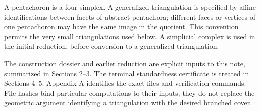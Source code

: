 \documentclass[11pt,letterpaper]{article}
\begin{document}
A pentachoron is a four-simplex. A generalized triangulation is specified by affine identifications between facets of abstract pentachora; different faces or vertices of one pentachoron may have the same image in the quotient. This convention permits the very small triangulations used below. A simplicial complex is used in the initial reduction, before conversion to a generalized triangulation.

The construction dossier and earlier reduction are explicit inputs to this note, summarized in Sections 2--3. The terminal standardness certificate is treated in Sections 4--5. Appendix A identifies the exact files and verification commands. File hashes bind particular computations to their inputs; they do not replace the geometric argument identifying a triangulation with the desired branched cover.
\end{document}

